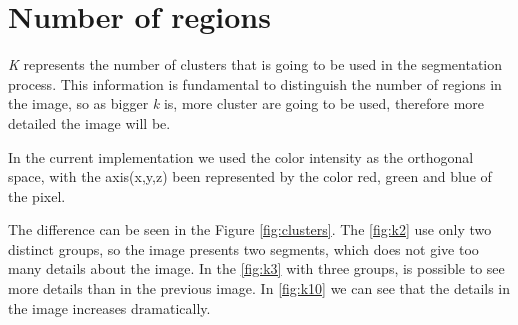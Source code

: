 \documentclass{article}
\begin{document}
\section{Number of regions}

\emph{K} represents the number of clusters that is going to be used in the segmentation process. 
This information is fundamental to distinguish the number of regions in the image, so as bigger \emph{k} is, more cluster are going to be used, therefore more detailed the image will be.  

In the current implementation we used the color intensity as the orthogonal space, with the axis(x,y,z) been represented by the color red, green and blue of the pixel.

The difference can be seen in the Figure \ref{fig:clusters}. The \ref{fig:k2} use only two distinct groups, so the image presents two segments, which does not give too many details about the image.  In the \ref{fig:k3} with three groups, is possible to see more details than in the previous image. In \ref{fig:k10} we can see that the details in the image increases dramatically.
\end{document}
